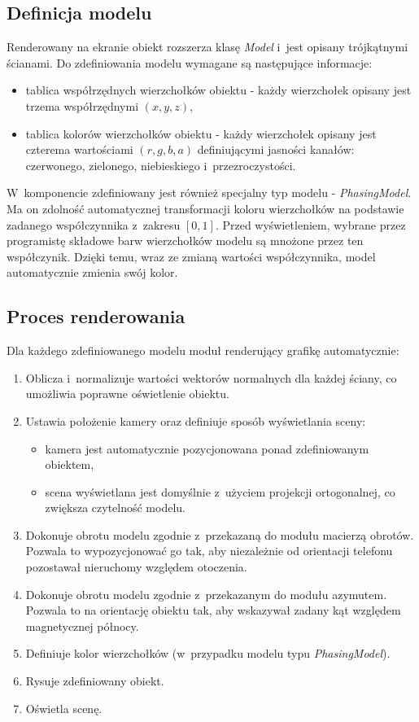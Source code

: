 \documentclass[a4paper,twocolumn,11pt]{article}
\begin{document}
\subsection{Definicja modelu}
 Renderowany na ekranie obiekt rozszerza klasę \emph{Model} i~jest opisany trójkątnymi ścianami.
 Do zdefiniowania modelu wymagane są następujące informacje:

 \begin{itemize}
  \item tablica współrzędnych wierzchołków obiektu - każdy wierzchołek opisany jest trzema współrzędnymi $(x, y, z)$,
  \item tablica kolorów wierzchołków obiektu - każdy wierzchołek opisany jest czterema wartościami $(r, g, b, a)$ definiującymi jasności kanałów: czerwonego, zielonego, niebieskiego i~przezroczystości.
 \end{itemize}

 W~komponencie zdefiniowany jest również specjalny typ modelu - \emph{PhasingModel}.
 Ma on zdolność automatycznej transformacji koloru wierzchołków na podstawie zadanego współczynnika z~zakresu $[0, 1]$.
 Przed wyświetleniem, wybrane przez programistę składowe barw wierzchołków modelu są mnożone przez ten współczynik.
 Dzięki temu, wraz ze zmianą wartości współczynnika, model automatycznie zmienia swój kolor.

 
\subsection{Proces renderowania}
 Dla każdego zdefiniowanego modelu moduł renderujący grafikę automatycznie:

 \begin{enumerate}
  \item Oblicza i~normalizuje wartości wektorów normalnych dla każdej ściany, co umożliwia poprawne oświetlenie obiektu.
  \item Ustawia położenie kamery oraz definiuje sposób wyświetlania sceny:
   \begin{itemize}
    \item kamera jest automatycznie pozycjonowana ponad zdefiniowanym obiektem,
    \item scena wyświetlana jest domyślnie z~użyciem projekcji ortogonalnej, co zwiększa czytelność modelu.
   \end{itemize}
  \item Dokonuje obrotu modelu zgodnie z~przekazaną do modułu macierzą obrotów.
   Pozwala to wypozycjonować go tak, aby niezależnie od orientacji telefonu pozostawał nieruchomy względem otoczenia.
  \item Dokonuje obrotu modelu zgodnie z~przekazanym do modułu azymutem.
   Pozwala to na orientację obiektu tak, aby wskazywał zadany kąt względem magnetycznej północy.
  \item Definiuje kolor wierzchołków (w~przypadku modelu typu \emph{PhasingModel}).
  \item Rysuje zdefiniowany obiekt.
  \item Oświetla scenę.
 \end{enumerate}
\end{document}
